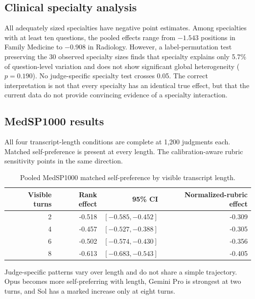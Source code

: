 \documentclass[11pt]{article}
\begin{document}
\subsection{Clinical specialty analysis}

All adequately sized specialties have negative point estimates. Among
specialties with at least ten questions, the pooled effects range from
$-1.543$ positions in Family Medicine to $-0.908$ in Radiology. However, a
label-permutation test preserving the 30 observed specialty sizes finds that
specialty explains only 5.7\% of question-level variation and does not show
significant global heterogeneity ($p=0.190$). No judge-specific specialty test
crosses 0.05. The correct interpretation is not that every specialty has an
identical true effect, but that the current data do not provide convincing
evidence of a specialty interaction.

\subsection{MedSP1000 results}

All four transcript-length conditions are complete at 1,200 judgments each.
Matched
self-preference is present at every length. The calibration-aware rubric
sensitivity points in the same direction.

\begin{table}[htbp]
\centering
\small
\caption{Pooled MedSP1000 matched self-preference by visible transcript length.}
\label{tab:med-pooled}
\begin{tabular}{rrrr}
\toprule
Visible turns & Rank effect & 95\% CI & Normalized-rubric effect \\
\midrule
2 & -0.518 & $[-0.585,-0.452]$ & -0.309 \\
4 & -0.457 & $[-0.527,-0.388]$ & -0.305 \\
6 & -0.502 & $[-0.574,-0.430]$ & -0.356 \\
8 & -0.613 & $[-0.683,-0.543]$ & -0.405 \\
\bottomrule
\end{tabular}
\end{table}
\FloatBarrier

Judge-specific patterns vary over length and do not share a simple trajectory.
Opus becomes more self-preferring with length, Gemini Pro is strongest at two
turns, and Sol has a marked increase only at eight turns.
\end{document}
